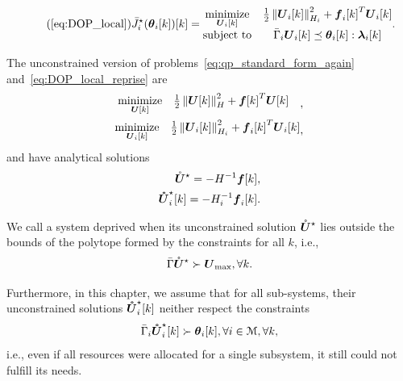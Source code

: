 \documentclass[../main.tex]{subfiles}
\begin{document}
\begin{equation}
  \label{eq:DOP_local_reprise}
  \tag{\ref*{eq:DOP_local}}
  \eqoptobji(\thetaik)[k]=
  \begin{matrix}
    \minimize\limits_{\vec{U}_{i}[k]}&\frac{1}{2}\norm{\vec{U}_{i}[k]}^{2}_{H_{i}} + {\vec{f}_{i}[k]}^{T}\vec{U}_{i}[k]\\
    \mathrm{subject~ to} & \bar{\Gamma}_{i}\vec{U}_{i}[k] \preceq \thetaik:\lambdaik
  \end{matrix}.
\end{equation}

The unconstrained version of problems~\eqref{eq:qp_standard_form_again} and~\eqref{eq:DOP_local_reprise} are
\begin{align}
  \label{eq:qp_standard_form_unconstrained}
  \begin{aligned}
    \begin{matrix}
      \mathop{\textrm{minimize}}\limits_{\boldsymbol{U}[k]} &
                                                 \frac{1}{2}\left\lVert\boldsymbol{U}[k]\right\rVert^{2}_{H} + {\boldsymbol{f}[k]}^{T}\boldsymbol{U}[k] &\\
    \end{matrix},
  \end{aligned}\\
  \label{eq:DOP_local_unconstrained}
  \begin{aligned}
    \begin{matrix}
    \mathop{\textrm{minimize}}\limits_{\boldsymbol{U}_{i}[k]}&\frac{1}{2}\left\lVert\boldsymbol{U}_{i}[k]\right\rVert^{2}_{H_{i}} + {\boldsymbol{f}_{i}[k]}^{T}\boldsymbol{U}_{i}[k]\\
    \end{matrix},
  \end{aligned}
\end{align}
and have analytical solutions~\cite{BoydVandenberghe2004}
\begin{align}
  \label{eq:qp_standard_form_unconstrained_solution}
  \optuncU=-H^{-1}\vec{f}[k],\\
  \label{eq:DOP_local_unconstrained_solution}
  \optuncUik=-H_{i}^{-1}\vec{f}_{i}[k].
\end{align}

We call a system deprived when its unconstrained solution ${\mathring{\boldsymbol{U}}^{\star}}$ lies outside the bounds of the polytope formed by the constraints for all $k$, i.e.,
\begin{equation}
\bar{\Gamma}{\mathring{\boldsymbol{U}}^{\star}}\succ {\boldsymbol{U}}_{\text{max}}, \forall k.
\end{equation}

Furthermore, in this chapter, we assume that for all sub-systems, their unconstrained solutions $\optuncUik$ neither respect the constraints
\begin{equation}
\bar{\Gamma}_{i}\optuncUik\succ \thetaik, \forall i\in\set{M}, \forall k,
\end{equation}
i.e., even if all resources were allocated for a single subsystem, it still could not fulfill its needs.
\end{document}
